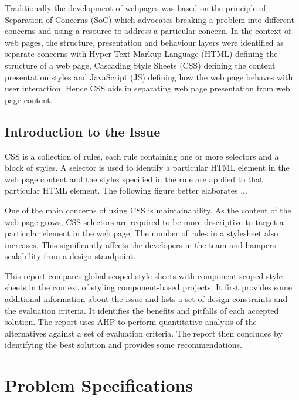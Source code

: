 \documentclass[12pt]{article}
\begin{document}
Traditionally the development of webpages was based on the principle of Separation of Concerns (SoC) which advocates breaking a problem into different concerns and using a resource to address a particular concern. In the context of web pages, the structure, presentation and behaviour layers were identified as separate concerns with Hyper Text Markup Language (HTML) defining the structure of a web page, Cascading Style Sheets (CSS) defining the content presentation styles and JavaScript (JS) defining how the web page behaves with user interaction. Hence CSS aids in separating web page presentation from web page content.


\subsection{Introduction to the Issue}
CSS is a collection of rules, each rule containing one or more selectors and a block of styles. A selector is used to identify a particular HTML element in the web page content and the styles specified in the rule are applied to that particular HTML element. The following figure better elaborates ... 


One of the main concerns of using CSS is maintainability. As the content of the web page grows, CSS selectors are required to be more descriptive to target a particular element in the web page. The number of rules in a stylesheet also increases. This significantly affects the developers in the team and hampers scalability from a design standpoint.


This report compares global-scoped style sheets with component-scoped style sheets in the context of styling component-based projects. It first provides some additional information about the issue and lists a set of design constraints and the evaluation criteria. It identifies the benefits and pitfalls of each accepted solution. The report uses AHP to perform quantitative analysis of the alternatives against a set of evaluation criteria. The report then concludes by identifying the best solution and provides some recommendations.


\section{Problem Specifications}
\end{document}
